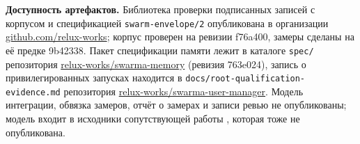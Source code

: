 \documentclass[10pt,a4paper]{article}
\newcommand{\measured}[1]{#1}
\begin{document}
\textbf{Доступность артефактов.} Библиотека проверки подписанных записей с корпусом и спецификацией \texttt{swarm-envelope/2} опубликована в организации \href{https://github.com/relux-works}{github.com/relux-works}; корпус проверен на ревизии f76a400, замеры сделаны на её предке 9b42338. Пакет спецификации памяти лежит в каталоге \texttt{spec/} репозитория \href{https://github.com/relux-works/swarma-memory}{relux-works/swarma-memory} (ревизия 763e024), запись о привилегированных запусках находится в \texttt{docs/root-qualification-evidence.md} репозитория \href{https://github.com/relux-works/swarma-user-manager}{relux-works/swarma-user-manager}. Модель интеграции, обвязка замеров, отчёт о замерах и записи ревью \measured{не опубликованы}; модель входит в исходники сопутствующей работы \cite{swarmatrust}, которая тоже \measured{не опубликована}.
\end{document}
